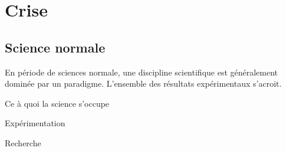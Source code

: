 

\section{Crise}

  \subsection{Science normale}

En période de sciences normale, une discipline scientifique est généralement dominée par un paradigme. L'ensemble des résultats expérimentaux s'acroit.

Ce à quoi la science s'occupe

Expérimentation

Recherche







